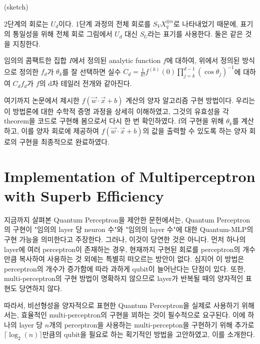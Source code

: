 \begin{pf}(sketch)

    2단계의 회로는 \(U_d\)이다. 1단계 과정의 전체 회로를 \(S_VX_q^{\otimes n}\)로 나타내었기 때문에, 표기의 통일성을 위해 전체 회로 그림에서 \(U_d\) 대신 \(S_U\)라는 표기를 사용한다. 둘은 같은 것을 지칭한다.


\end{pf}

\begin{corollary}
    임의의 콤팩트한 집합 \(I\)에서 정의된 analytic function \(f\)에 대하여, 위에서 정의된 방식으로 정의한 \(f_d\)가 \(\theta_k\)를 잘 선택하면 실수 \(C_d = \frac{1}{k!}f^{(k)}(0)\prod_{j=k}^{d-1}(\cos\theta_j)^{-1}\)에 대하여 \(C_df_d\)가 \(f\)의 d차 테일러 전개와 같아진다.
\end{corollary}

여기까지 논문에서 제시한 \(f(\vec{w}\cdot\vec{x}+b)\) 계산의 양자 알고리즘 구현 방법이다.
우리는 이 방법론에 대한 수학적 증명 과정을 상세히 이해하였고, 그것의 유효성을 각 theorem을 코드로 구현해 봄으로서 다시 한 번 확인하였다.
f의 구현을 위해 \(\theta_k\)를 계산하고, 이를 양자 회로에 제공하여 \(f(\vec{w}\cdot\vec{x}+b)\)의 값을 출력할 수 있도록 하는 양자 회로의 구현을 최종적으로 완료하였다.

\section{Implementation of Multiperceptron with Superb Efficiency}

지금까지 살펴본 Quantum Perceptron을 제안한 문헌에서는, Quantum Perceptron의 구현이 "임의의 layer 당 neuron 수"와 "임의의 layer 수"에 대한 Quantum-MLP의 구현 가능을 의미한다고 주장한다. 그러나, 이것이 당연한 것은 아니다. 먼저 하나의 layer에 여러 perceptron이 존재하는 경우, 현재까지 구현된 회로를 perceptron의 개수만큼 복사하여 사용하는 것 외에는 특별히 떠오르는 방안이 없다. 심지어 이 방법은 perceptron의 개수가 증가함에 따라 과하게 qubit이 늘어난다는 단점이 있다. 또한, multi-perceptron의 구현 방법이 명확하지 않으므로 layer가 반복될 때의 양자적인 표현도 당연하지 않다.

따라서, 비선형성을 양자적으로 표현한 Quantum Perceptron을 실제로 사용하기 위해서는, 효율적인 multi-perceptron의 구현을 꾀하는 것이 필수적으로 요구된다. 이에 하나의 layer 당 $n$개의 perceptron을 사용하는 multi-percepton을 구현하기 위해 추가로 $\lceil {\log_2(n)} \rceil$만큼의 qubit을 필요로 하는 획기적인 방법을 고안하였고, 이를 소개한다.


